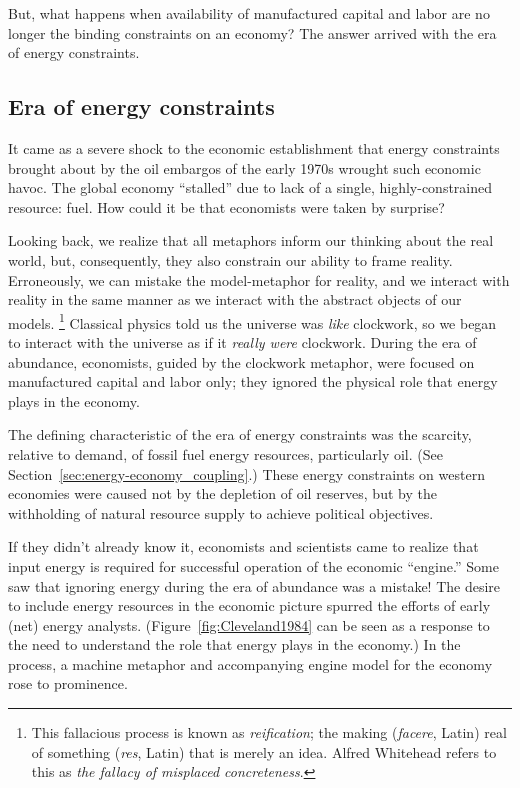 But, what happens when availability of manufactured capital and labor are no longer
the binding constraints on an economy?
The answer arrived with the era of energy constraints.


\subsection{Era of energy constraints}
\label{sec:era_of_energy_constraints}

It came as a severe shock to the economic establishment
that energy constraints brought about by the oil embargos of the early 1970s
wrought such economic havoc.
The global economy
``stalled'' due to lack of 
a single, highly-constrained resource:
fuel.
How could it be that economists were taken by surprise?

Looking back, we realize that 
all metaphors inform our thinking about the real world,
but, consequently,
they also constrain our ability to frame reality.
Erroneously, we can mistake the model-metaphor for reality, and
we interact with reality in the same manner 
as we interact with the abstract objects of our
models.%
	\footnote{
	This fallacious process is known as
	\emph{reification}; the making (\emph{facere}, Latin) real of
	something (\emph{res}, Latin) that is merely an idea.
	Alfred Whitehead refers to this as
	\emph{the fallacy of misplaced concreteness}.\cite{Whitehead2011}
	}
Classical physics told us the universe was
\emph{like} clockwork, 
so we began to interact with the universe
as if it \emph{really were} clockwork.
During the era of abundance, 
economists, guided by the clockwork metaphor,
were focused on manufactured capital and labor only;
they ignored the physical role that energy plays in the economy.

The defining characteristic of the era of energy constraints
was the scarcity, relative to demand, of fossil fuel energy resources, particularly oil.
(See Section~\ref{sec:energy-economy_coupling}.)
These energy constraints on western economies were caused
not by the depletion of oil reserves, 
but by the withholding of natural resource supply to achieve political objectives.

If they didn't already know it, economists and scientists
came to realize that input energy is required
for successful operation of the economic ``engine.''
Some saw that ignoring energy during the era of abundance
was a mistake!
The desire to include energy resources
in the economic picture
spurred the efforts of early (net) energy 
analysts.\cite{Gilliland1975, Chapman1976}
(Figure~\ref{fig:Cleveland1984} can be seen as a response
to the need to understand the role that energy 
plays in the economy.)
In the process, a machine metaphor and 
accompanying engine model for the economy 
rose to prominence.

